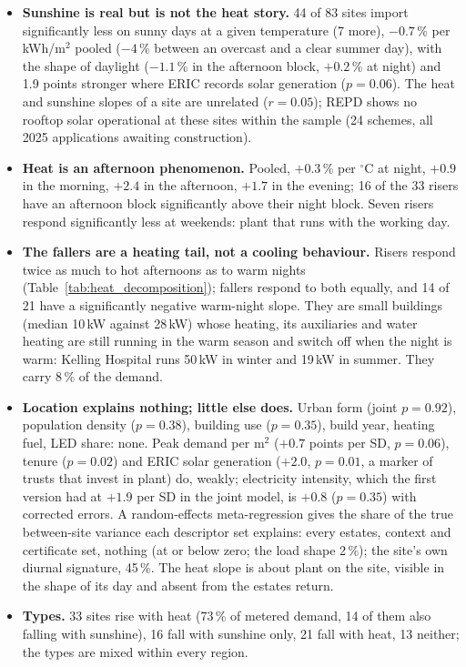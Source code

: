 \documentclass[10pt,a4paper]{article}
\begin{document}
\begin{itemize}
\item \textbf{Sunshine is real but is not the heat story.} 44 of 83 sites import significantly less on sunny days at a given temperature (7 more), $-0.7$\,\% per kWh/m$^2$ pooled ($-4$\,\% between an overcast and a clear summer day), with the shape of daylight ($-1.1$\,\% in the afternoon block, $+0.2$\,\% at night) and 1.9 points stronger where ERIC records solar generation ($p = 0.06$). The heat and sunshine slopes of a site are unrelated ($r = 0.05$); REPD shows no rooftop solar operational at these sites within the sample (24 schemes, all 2025 applications awaiting construction).
\item \textbf{Heat is an afternoon phenomenon.} Pooled, $+0.3$\,\% per $^\circ$C at night, $+0.9$ in the morning, $+2.4$ in the afternoon, $+1.7$ in the evening; 16 of the 33 risers have an afternoon block significantly above their night block. Seven risers respond significantly less at weekends: plant that runs with the working day.
\item \textbf{The fallers are a heating tail, not a cooling behaviour.} Risers respond twice as much to hot afternoons as to warm nights (Table~\ref{tab:heat_decomposition}); fallers respond to both equally, and 14 of 21 have a significantly negative warm-night slope. They are small buildings (median 10\,kW against 28\,kW) whose heating, its auxiliaries and water heating are still running in the warm season and switch off when the night is warm: Kelling Hospital runs 50\,kW in winter and 19\,kW in summer. They carry 8\,\% of the demand.
\item \textbf{Location explains nothing; little else does.} Urban form (joint $p = 0.92$), population density ($p = 0.38$), building use ($p = 0.35$), build year, heating fuel, LED share: none. Peak demand per m$^2$ ($+0.7$ points per SD, $p = 0.06$), tenure ($p = 0.02$) and ERIC solar generation ($+2.0$, $p = 0.01$, a marker of trusts that invest in plant) do, weakly; electricity intensity, which the first version had at $+1.9$ per SD in the joint model, is $+0.8$ ($p = 0.35$) with corrected errors. A random-effects meta-regression gives the share of the true between-site variance each descriptor set explains: every estates, context and certificate set, nothing (at or below zero; the load shape 2\,\%); the site's own diurnal signature, 45\,\%. The heat slope is about plant on the site, visible in the shape of its day and absent from the estates return.
\item \textbf{Types.} 33 sites rise with heat (73\,\% of metered demand, 14 of them also falling with sunshine), 16 fall with sunshine only, 21 fall with heat, 13 neither; the types are mixed within every region.

\end{itemize}
\end{document}
